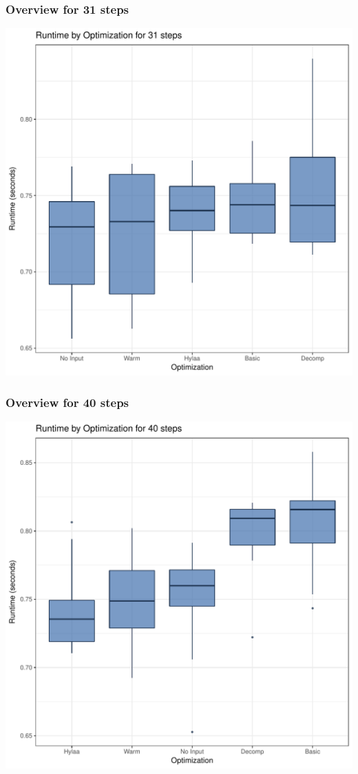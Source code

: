 \documentclass{article}\usepackage[]{graphicx}\usepackage[]{color}
\makeatletter
\def\maxwidth{ %
  \ifdim\Gin@nat@width>\linewidth
    \linewidth
  \else
    \Gin@nat@width
  \fi
}
\newenvironment{knitrout}{}{} %
\makeatother
\begin{document}
\subsubsection{Overview for 31 steps}
\begin{knitrout}
\color{fgcolor}
\includegraphics[width=\maxwidth]{figure/steps31-1} 

\end{knitrout}
\subsubsection{Overview for 40 steps}
\begin{knitrout}
\color{fgcolor}
\includegraphics[width=\maxwidth]{figure/steps40-1} 

\end{knitrout}
\end{document}
